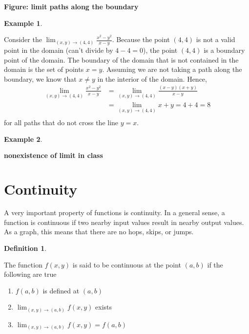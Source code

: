 \documentclass[
]{book}
\theoremstyle{definition}
\newtheorem{definition}{Definition}[chapter]
\theoremstyle{definition}
\newtheorem{example}{Example}[chapter]
\theoremstyle{definition}
\theoremstyle{remark}
\begin{document}
\textbf{Figure: limit paths along the boundary}

\begin{example}
\protect\hypertarget{exm:unlabeled-div-210}{}\label{exm:unlabeled-div-210}

Consider the \(\lim_{(x, y) \rightarrow (4, 4)} \frac{x^2 - y^2}{x - y}\). Because the point \((4, 4)\) is not a valid point in the domain (can't divide by \(4-4=0\)), the point \((4, 4)\) is a boundary point of the domain. The boundary of the domain that is not contained in the domain is the set of points \(x = y\). Assuming we are not taking a path along the boundary, we know that \(x \neq y\) in the interior of the domain. Hence,
\[
\begin{aligned}
\lim_{(x, y) \rightarrow (4, 4)} \frac{x^2 - y^2}{x - y} & = \lim_{(x, y) \rightarrow (4, 4)} \frac{(x - y)(x + y)}{x - y} \\
& = \lim_{(x, y) \rightarrow (4, 4)} x + y  = 4 + 4 = 8\\
\end{aligned}
\]
for all paths that do not cross the line \(y = x\).

\end{example}

\begin{example}
\protect\hypertarget{exm:unlabeled-div-211}{}\label{exm:unlabeled-div-211}

\textbf{nonexistence of limit in class}

\end{example}

\hypertarget{continuity}{%
\section{Continuity}\label{continuity}}

A very important property of functions is continuity. In a general sense, a function is continuous if two nearby input values result in nearby output values. As a graph, this means that there are no hops, skips, or jumps.

\begin{definition}
\protect\hypertarget{def:unlabeled-div-212}{}\label{def:unlabeled-div-212}

The function \(f(x, y)\) is said to be continuous at the point \((a, b)\) if the following are true

\begin{enumerate}
\def\labelenumi{\arabic{enumi})}
\item
  \(f(a, b)\) is defined at \((a, b)\)
\item
  \(\lim_{(x, y) \rightarrow (a, b)} f(x, y)\) exists
\item
  \(\lim_{(x, y) \rightarrow (a, b)} f(x, y) = f(a, b)\)
\end{enumerate}

\end{definition}
\end{document}

